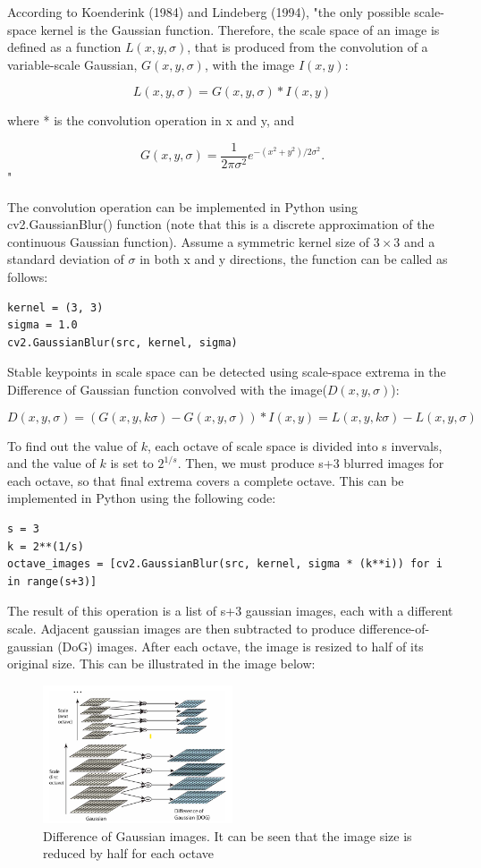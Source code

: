 According to Koenderink (1984) and Lindeberg (1994), "the only possible scale-space kernel is the Gaussian function. Therefore, the scale space of
an image is defined as a function $L(x, y, \sigma)$, that is produced from the convolution of a variable-scale Gaussian,
$G(x, y, \sigma)$, with the image $I(x, y)$:

$$
L(x, y, \sigma) = G(x, y, \sigma) * I(x, y)
$$

where * is the convolution operation in x and y, and

$$
G(x, y, \sigma) = \frac{1}{2\pi\sigma^2}e^{-(x^2 + y^2)/2\sigma^2}.
$$"

The convolution operation can be implemented in Python using cv2.GaussianBlur() function (note that this is a discrete approximation of the continuous
Gaussian function). Assume a symmetric kernel size of $3 \times 3$ and a standard deviation of $\sigma$ in both
x and y directions, the function can be called as follows:

\begin{verbatim}
kernel = (3, 3)
sigma = 1.0
cv2.GaussianBlur(src, kernel, sigma)
\end{verbatim}

Stable keypoints in scale space can be detected using scale-space extrema in the Difference of Gaussian function convolved with the image($D(x, y, \sigma)$):

$$
D(x, y, \sigma) = (G(x, y, k\sigma) - G(x, y, \sigma)) * I(x, y) = L(x, y, k\sigma) - L(x, y, \sigma)
$$

To find out the value of $k$, each octave of scale space is divided into s invervals, and the value of $k$ is set to $2^{1/s}$. Then, we must produce
s+3 blurred images for each octave, so that final extrema covers a complete octave. This can be implemented in Python using the following code:

\begin{verbatim}
s = 3
k = 2**(1/s)
octave_images = [cv2.GaussianBlur(src, kernel, sigma * (k**i)) for i in range(s+3)]
\end{verbatim}

The result of this operation is a list of s+3 gaussian images, each with a different scale. Adjacent gaussian images are then subtracted to produce difference-of-gaussian (DoG)
images. After each octave, the image is resized to half of its original size. This can be illustrated in the image below:

\begin{figure}[h]
    \centering
    \includegraphics[width=0.5\textwidth]{../images/DoG}
    \caption{Difference of Gaussian images. It can be seen that the image size is reduced by half for each octave~\cite{Lowe.2004}}
    \label{fig:DoG}
\end{figure}

